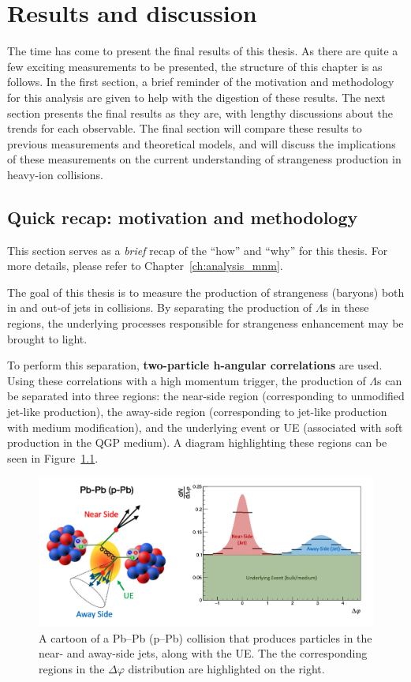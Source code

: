\chapter{Results and discussion}
\label{chapter_results}

The time has come to present the final results of this thesis. As there are quite a few exciting measurements to be presented, the structure of this chapter is as follows. In the first section, a brief reminder of the motivation and methodology for this analysis are given to help with the digestion of these  results. The next section presents the final results as they are, with lengthy discussions about the trends for each observable. The final section will compare these results to previous measurements and theoretical models, and will discuss the implications of these measurements on the current understanding of strangeness production in heavy-ion collisions.


\section{Quick recap: motivation and methodology}

This section serves as a \textit{brief} recap of the ``how'' and ``why'' for this thesis. For more details, please refer to Chapter~\ref{ch:analysis_mnm}.

The goal of this thesis is to measure the production of strangeness (\lmb baryons) both in and out-of jets in \pPb collisions. By separating the production of $\Lambda$s in these regions, the underlying processes responsible for strangeness enhancement may be brought to light.

To perform this separation, \textbf{two-particle h-\lmb angular correlations} are used. Using these correlations with a high momentum trigger, the production of $\Lambda$s can be separated into three regions: the near-side region (corresponding to unmodified jet-like production), the away-side region (corresponding to jet-like production with medium modification), and the underlying event or UE (associated with soft production in the QGP medium). A diagram highlighting these regions can be seen in Figure~\ref{fig:dphi_cartoon_ref}.

\begin{figure}[h]
\centering
\includegraphics[width=\textwidth]{figures/mnm/dphi_cartoon.png}
\caption{A cartoon of a Pb--Pb (p--Pb) collision that produces particles in the near- and away-side jets, along with the UE. The the corresponding regions in the $\Delta\varphi$ distribution are highlighted on the right.}
\label{fig:dphi_cartoon_ref}
\end{figure}

